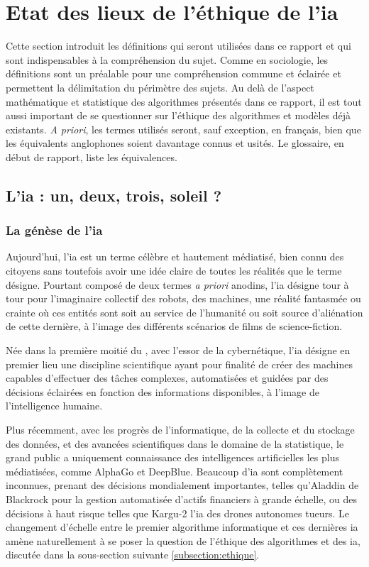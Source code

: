 \section{Etat des lieux de l'éthique de l'\gls{ia}}

Cette section introduit les définitions qui seront utilisées dans ce rapport et qui sont indispensables à la compréhension du sujet. Comme en sociologie, les définitions sont un préalable pour une compréhension commune et éclairée et permettent la délimitation du périmètre des sujets. Au delà de l'aspect mathématique et statistique des algorithmes présentés dans ce rapport, il est tout aussi important de se questionner sur l'éthique des algorithmes et modèles déjà existants. \textit{A priori}, les termes utilisés seront, sauf exception, en français, bien que les équivalents anglophones soient davantage connus et usités. Le glossaire, en début de rapport, liste les équivalences.

\subsection{L'\gls{ia} : un, deux, trois, soleil ?}

\subsubsection{La génèse de l'\gls{ia}}
Aujourd'hui, l'\gls{ia} est un terme célèbre et hautement médiatisé, bien connu des citoyens sans toutefois avoir une idée claire de toutes les réalités que le terme désigne. Pourtant composé de deux termes \textit{a priori} anodins, l'\gls{ia} désigne tour à tour pour l'imaginaire collectif des robots, des machines, une réalité fantasmée ou crainte où ces entités sont soit au service de l'humanité ou soit source d'aliénation de cette dernière, à l'image des différents scénarios de films de science-fiction.


Née dans la première moitié du , avec l'essor de la cybernétique, l'\gls{ia} désigne en premier lieu une discipline scientifique ayant pour finalité de créer des machines capables d'effectuer des tâches complexes, automatisées et guidées par des décisions éclairées en fonction des informations disponibles, à l'image de l'intelligence humaine.

Plus récemment, avec les progrès de l'informatique, de la collecte et du stockage des données, et des avancées scientifiques dans le domaine de la statistique, le grand public a uniquement connaissance des intelligences artificielles les plus médiatisées, comme AlphaGo et DeepBlue. Beaucoup d'\gls{ia} sont complètement inconnues, prenant des décisions mondialement importantes, telles qu'Aladdin de Blackrock pour la gestion automatisée d'actifs financiers à grande échelle, ou des décisions à haut risque telles que Kargu-2 l'\gls{ia} des drones autonomes tueurs. Le changement d'échelle entre le premier algorithme informatique et ces dernières \gls{ia} amène naturellement à se poser la question de l'éthique des algorithmes et des \gls{ia}, discutée dans la sous-section suivante \ref{subsection:ethique}.

